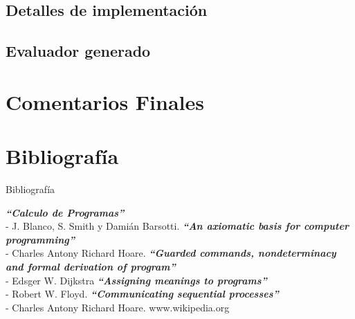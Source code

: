\documentclass[10pt]{beamer}
\begin{document}
\subsection{Detalles de implementación}


\subsection{Evaluador generado}


\section{Comentarios Finales}

\section{Bibliografía}
   \begin{frame}
   \small{Bibliografía} 
   \begin{thebibliography}{66}
    \scriptsize{
     \textbf{\textit{``Calculo de Programas''}}\\  - J. Blanco, S. Smith y Damián Barsotti.
     \textbf{\textit{``An axiomatic basis for computer programming''}}\\ - Charles Antony Richard Hoare.
     \textbf{\textit{``Guarded commands, nondeterminacy and formal derivation of program''}}\\ - Edsger W. Dijkstra
     \textbf{\textit{``Assigning meanings to programs''}}\\ - Robert W. Floyd.
     \textbf{\textit{``Communicating sequential processes''}}\\  - Charles Antony Richard Hoare.
     www.wikipedia.org
    }
    \end{thebibliography}
    \end{frame}
\end{document}
